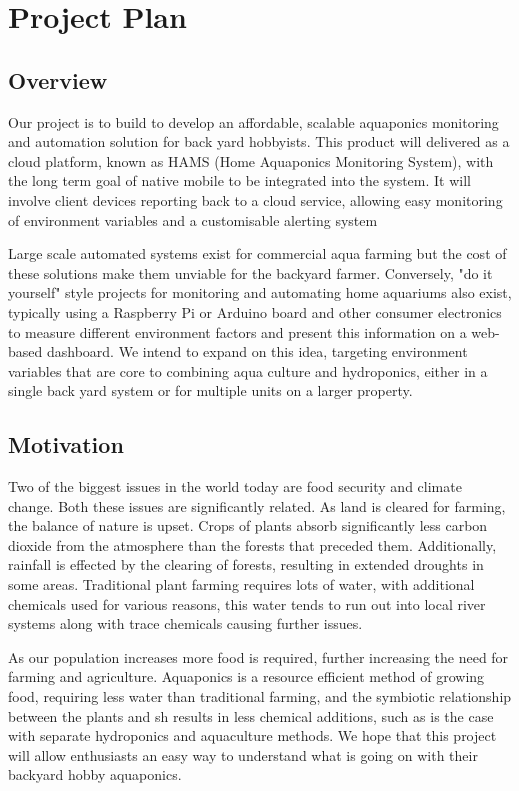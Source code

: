 \documentclass[11pt, oneside, a4paper, titlepage]{article}
\begin{document}
\section{Project Plan}
\subsection{Overview}
Our project is to build to develop an affordable, scalable aquaponics monitoring and automation solution for back yard hobbyists.  This product will delivered as a cloud platform, known as HAMS (Home Aquaponics Monitoring System), with the long term goal of native mobile to be integrated into the system.  It will involve client devices reporting back to a cloud service, allowing easy monitoring of environment variables and a customisable alerting system 

Large scale automated systems exist for commercial aqua farming but the cost of these solutions make them unviable for the backyard farmer. Conversely, "do it yourself" style projects for monitoring and automating home aquariums also exist, typically using a Raspberry Pi or Arduino board and other consumer electronics to measure different environment factors and present this information on a web-based dashboard. We intend to expand on this idea, targeting environment variables that are core to combining aqua culture and hydroponics, either in a single back yard system or for multiple units on a larger property.  

\subsection{Motivation}
Two of the biggest issues in the world today are food security and climate change. Both these issues are significantly related. As land is cleared for farming, the balance of nature is upset. Crops of plants absorb significantly less carbon dioxide from the atmosphere than the forests that preceded them. Additionally, rainfall is effected by the clearing of forests, resulting in extended droughts in some areas. Traditional plant farming requires lots of water, with additional chemicals used for various reasons, this water tends to run out into local river systems along with trace chemicals causing further issues. 

As our population increases more food is required, further increasing the need for farming and agriculture. Aquaponics is a resource efficient method of growing food, requiring less water than traditional farming, and the symbiotic relationship between the plants and sh results in less chemical additions, such as is the case with separate hydroponics and aquaculture methods. We hope that this project will allow enthusiasts an easy way to understand what is going on with their backyard hobby aquaponics. 
\end{document}
